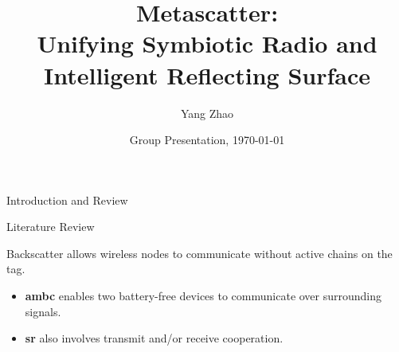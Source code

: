 \documentclass[9pt]{beamer}
\title{Metascatter: \\Unifying Symbiotic Radio and Intelligent Reflecting Surface}
\author{Yang Zhao}
\institute{Department of Electrical and Electronic Engineering\\Imperial College London}
\date{Group Presentation, \today}
\begin{document}
	\frame{\titlepage}

	\begin{section}{Introduction and Review}
		\begin{subsection}{Literature Review}
			\begin{frame}{}
				Backscatter allows wireless nodes to \alert{communicate} without active  chains on the tag.
				\begin{figure}[!t]
					\centering
				\end{figure}
				\begin{itemize}
					\item \textbf{\gls{ambc}} enables two battery-free devices to communicate over surrounding  signals.
					\item \textbf{\gls{sr}} also involves transmit and/or receive cooperation.
				\end{itemize}
			\end{frame}


\end{subsection}
\end{section}
\end{document}

